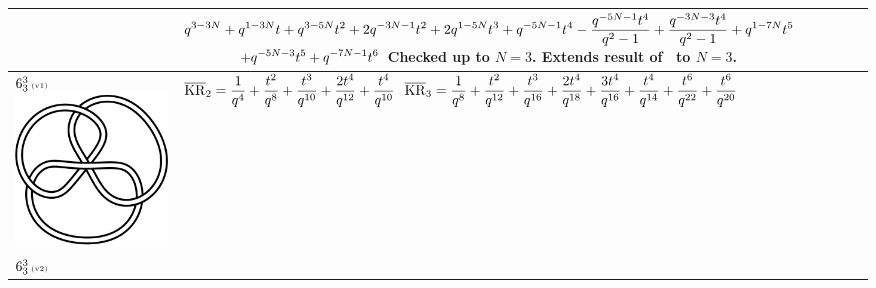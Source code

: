 \documentclass{compositio}
\theoremstyle{definition}
\numberwithin{equation}{section}
\begin{document}
{\begin{longtable}{p{}|p{}}
& 
\newline
$
\displaystyle{%
q^{3-3 N}+q^{1-3 N} t+q^{3-5 N} t^2+2 q^{-3 N-1} t^2+2 q^{1-5 N} t^3+q^{-5 N-1} t^4-\frac{q^{-5 N-1} t^4}{q^2-1}+\frac{q^{-3 N-3} t^4}{q^2-1}+q^{1-7 N} t^5
}
$
\newline
$
\displaystyle{%
\qquad\qquad +q^{-5 N-3} t^5+q^{-7 N-1} t^6
}
$
\newline\newline
Checked up to $N=3$. Extends result of~\cite{r0508510} to $N=3$. 
\\
\hline
$6_{3}^3\,\text{{\tiny (v1)}}$
\includegraphics[scale=0.07,angle=0]{link6_3_3.pdf} 
& 
\newline
$
\displaystyle{%
\overline{\KR}_{2} = \frac{1}{q^4}+\frac{t^2}{q^8}+\frac{t^3}{q^{10}}+\frac{2 t^4}{q^{12}}+\frac{t^4}{q^{10}}
}
$
\newline 
$
\displaystyle{%
\overline{\KR}_{3} = \frac{1}{q^8}+\frac{t^2}{q^{12}}+\frac{t^3}{q^{16}}+\frac{2 t^4}{q^{18}}+\frac{3 t^4}{q^{16}}+\frac{t^4}{q^{14}}+\frac{t^6}{q^{22}}+\frac{t^6}{q^{20}}
}
$
\newline
\\
\hline
$6_{3}^3\,\text{{\tiny (v2)}}$

\end{longtable}}
\end{document}
